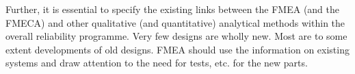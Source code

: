 \documentclass[./dissertation.tex]{subfiles}
\begin{document}
Further, it is essential to specify the existing links between the FMEA (and the FMECA) and other qualitative (and quantitative) analytical methods within the overall reliability programme.  Very few designs are wholly new. Most are to some extent developments of old designs. FMEA should use the information on existing systems and draw attention to the need for tests, etc. for the new parts.  
\end{document}
